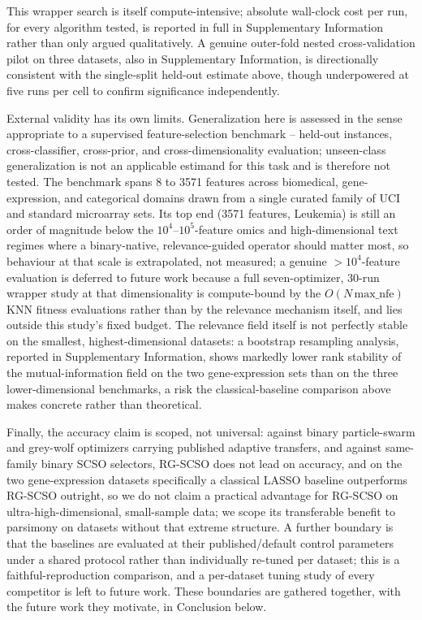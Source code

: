 \documentclass[iicol,sn-basic,pdflatex]{sn-jnl}
\begin{document}
This wrapper search is itself compute-intensive; absolute wall-clock cost
per run, for every algorithm tested, is reported in full in Supplementary
Information rather than only argued qualitatively. A genuine outer-fold
nested cross-validation pilot on three datasets, also in Supplementary
Information, is directionally consistent with the single-split held-out
estimate above, though underpowered at five runs per cell to confirm
significance independently.

External validity has its own limits. Generalization here is assessed in the
sense appropriate to a supervised feature-selection benchmark -- held-out
instances, cross-classifier, cross-prior, and cross-dimensionality evaluation;
unseen-class generalization is not an applicable estimand for this task and is
therefore not tested. The benchmark spans
8 to 3571 features across biomedical, gene-expression, and
categorical domains drawn from a single curated family of UCI and standard
microarray sets. Its top end (3571 features, Leukemia) is still an order
of magnitude below the $10^4$--$10^5$-feature omics and high-dimensional text
regimes where a binary-native, relevance-guided operator should matter most,
so behaviour at that scale is extrapolated, not measured; a genuine
$>$$10^4$-feature evaluation is deferred to future work because a full
seven-optimizer, 30-run wrapper study at that dimensionality is compute-bound
by the $O(N\,\mathrm{max\_nfe})$ KNN fitness evaluations rather than by the
relevance mechanism itself, and lies outside this study's fixed budget. The
relevance field
itself is not perfectly stable on the smallest, highest-dimensional
datasets: a bootstrap resampling analysis, reported in Supplementary
Information, shows markedly lower rank stability of the mutual-information
field on the two gene-expression sets than on the three lower-dimensional
benchmarks, a risk the classical-baseline comparison above makes concrete
rather than theoretical.

Finally, the accuracy claim is scoped, not universal: against
binary particle-swarm and grey-wolf optimizers carrying published adaptive
transfers, and against same-family binary SCSO selectors, RG-SCSO does not
lead on accuracy, and on the two gene-expression datasets specifically a
classical LASSO baseline outperforms RG-SCSO outright, so we do
not claim a practical advantage for RG-SCSO on ultra-high-dimensional,
small-sample data; we scope its transferable benefit to parsimony on
datasets without that extreme structure. A further boundary is that the
baselines are evaluated at their published/default control parameters under a
shared protocol rather than individually re-tuned per dataset; this is a
faithful-reproduction comparison, and a per-dataset tuning study of every
competitor is left to future work. These boundaries are gathered
together, with the future work they motivate, in Conclusion below.
\end{document}
